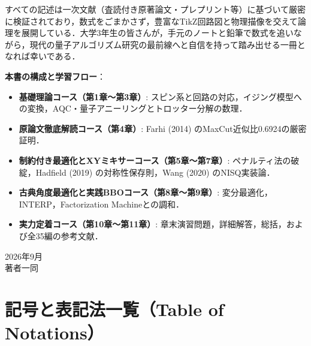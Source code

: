 \documentclass[11pt,a4paper,oneside,openany]{ltjsbook}
\theoremstyle{definition}
\theoremstyle{plain}
\theoremstyle{remark}
\begin{document}
すべての記述は一次文献（査読付き原著論文・プレプリント等）に基づいて厳密に検証されており，数式をごまかさず，豊富なTikZ回路図と物理描像を交えて論理を展開している．大学3年生の皆さんが，手元のノートと鉛筆で数式を追いながら，現代の量子アルゴリズム研究の最前線へと自信を持って踏み出せる一冊となれば幸いである．

\vspace{5mm}
\noindent
\textbf{本書の構成と学習フロー}：
\begin{itemize}
    \item \textbf{基礎理論コース（第1章〜第3章）}: スピン系と回路の対応，イジング模型への変換，AQC・量子アニーリングとトロッター分解の数理．
    \item \textbf{原論文徹底解読コース（第4章）}: Farhi (2014) のMaxCut近似比0.6924の厳密証明．
    \item \textbf{制約付き最適化とXYミキサーコース（第5章〜第7章）}: ペナルティ法の破綻，Hadfield (2019) の対称性保存則，Wang (2020) のNISQ実装論．
    \item \textbf{古典角度最適化と実践BBOコース（第8章〜第9章）}: 変分最適化，INTERP，Factorization Machineとの調和．
    \item \textbf{実力定着コース（第10章〜第11章）}: 章末演習問題，詳細解答，総括，および全35編の参考文献．
\end{itemize}

\vspace{5mm}
\begin{flushright}
2026年9月\\
著者一同
\end{flushright}

\newpage

\chapter*{記号と表記法一覧（Table of Notations）}
\end{document}
